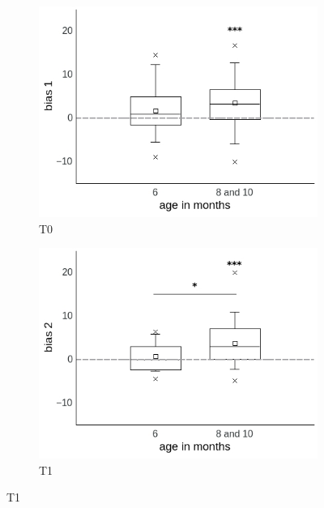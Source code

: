 \documentclass[a4paper]{scrreprt}
\begin{document}
\begin{figure}
\centering
    \begin{subfigure}[b]{0.49\textwidth}
        \includegraphics[width=\textwidth]{figs/sec3/age/age2_diff1_mod1.jpeg}
        \caption{T0}
    \end{subfigure}
\begin{subfigure}[b]{0.49\textwidth}
        \includegraphics[width=\textwidth]{figs/sec3/age/age2_diff2_mod1.jpeg}
        \caption{T1}
    \end{subfigure}
    

\end{figure}
\end{document}
